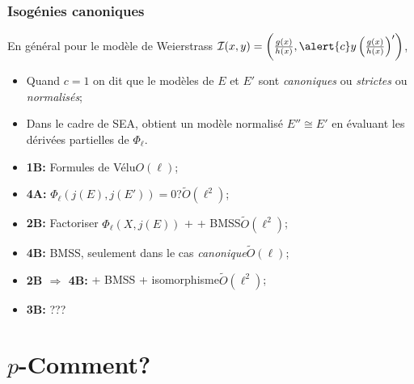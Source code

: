 \documentclass[10pt]{beamer}
\newcommand{\isom}{\cong}  %
\newcommand{\0}{\mathcal{O}}  %
\newcommand{\isog}[1]{\mathcal{#1}}  %
\newcommand{\I}{\isog{I}}  %
\newcommand{\tildO}{\tilde{O}}  %
\begin{document}

\begin{frame}
  \frametitle{Isogénies canoniques}

  En général pour le modèle de Weierstrass $\I(x,y) =
  \left(\frac{g(x)}{h(x)},
    \alert{c}y\left(\frac{g(x)}{h(x)}\right)'\right)$,

  \begin{itemize}
  \item Quand $c=1$ on dit que le modèles de $E$ et $E'$ sont
    \emph{canoniques} ou \emph{strictes} ou \emph{normalisés};
  \item Dans le cadre de SEA, \cite{elkies98} obtient un modèle
    normalisé $E''\isom E'$ en évaluant les dérivées partielles de
    $\Phi_\ell$.
  \end{itemize}

  \begin{itemize}
  \item \textbf{1B:} Formules de Vélu\dotfill$O(\ell)$;
  \item \textbf{4A:} $\Phi_\ell(j(E),j(E')) = 0$?\dotfill$\tildO(\ell^2)$;
  \item \textbf{2B:} Factoriser $\Phi_\ell(X,j(E))$ + \cite{elkies98} + BMSS\dotfill$\tildO(\ell^2)$;
  \item \textbf{4B:} BMSS, seulement dans le cas \emph{canonique}\dotfill$\tildO(\ell)$;
  \item \textbf{2B $\Rightarrow$ 4B:} \cite{elkies98} + BMSS + isomorphisme\dotfill$\tildO(\ell^2)$;
  \item \textbf{3B:} ???
  \end{itemize}
\end{frame}


\section{$p$-Comment?}
\end{document}
